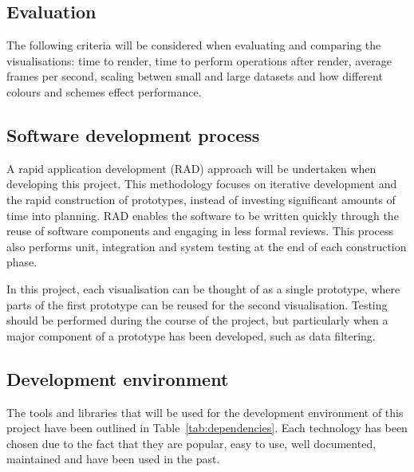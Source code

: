 \documentclass[
	fontsize=11pt
	headlines=2,
	footlines=2,
	parskip=half
]{scrartcl}
\begin{document}
{{		}

		\subsection{Evaluation} {
		\label{sec:evaluation}

			The following criteria will be considered when evaluating and comparing the visualisations: time to render, time to perform operations after render, average frames per second, scaling betwen small and large datasets and how different colours and schemes effect performance.

		}

		\subsection{Software development process} {
		\label{sec:software_development_process}

			A rapid application development (RAD) approach will be undertaken when developing this project. This methodology focuses on iterative development and the rapid construction of prototypes, instead of investing significant amounts of time into planning. RAD enables the software to be written quickly through the reuse of software components and engaging in less formal reviews. This process also performs unit, integration and system testing at the end of each construction phase. 

			In this project, each visualisation can be thought of as a single prototype, where parts of the first prototype can be reused for the second visualisation. Testing should be performed during the course of the project, but particularly when a major component of a prototype has been developed, such as data filtering.

		}
		
		\subsection{Development environment} {
		\label{sec:development_environment}

			The tools and libraries that will be used for the development environment of this project have been outlined in Table~\ref{tab:dependencies}. Each technology has been chosen due to the fact that they are popular, easy to use, well documented, maintained and have been used in the past.
		
}}
\end{document}
